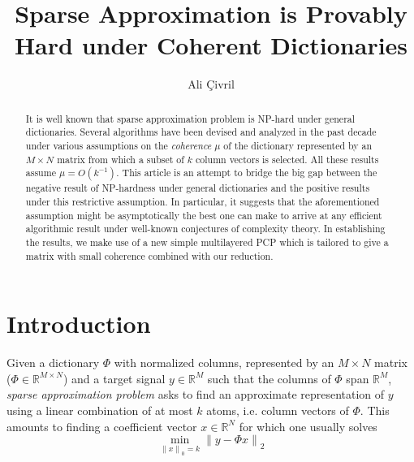 \documentclass[11pt]{article}
\title{Sparse Approximation is Provably Hard under Coherent Dictionaries}
\author{Ali {\c{C}}ivril}
\begin{document}
\maketitle

\begin{abstract}
It is well known that sparse approximation
problem is \textsf{NP}-hard under general dictionaries. Several algorithms
have been devised and analyzed in the past decade under various
assumptions on the \emph{coherence} $\mu$ of the dictionary
represented by an $M \times N$ matrix from which a subset of $k$
column vectors is selected. All these results assume $\mu=O(k^{-1})$.
This article is an attempt to bridge the big gap between the
negative result of \textsf{NP}-hardness under general dictionaries and the
positive results under this restrictive assumption. In particular,
it suggests that the aforementioned assumption might be asymptotically
the best one can make to arrive at any efficient algorithmic result
under well-known conjectures of complexity theory. In establishing the
results, we make use of a new simple multilayered PCP which is
tailored to give a matrix with small coherence combined with our
reduction.
\end{abstract}
%


\section{Introduction}
Given a dictionary $\Phi$ with normalized columns,
represented by an $M \times N$ matrix ($\Phi \in \mathbb{R}^{M
\times N}$) and a target signal $y \in \mathbb{R}^M$ such that the columns
of $\Phi$ span $\mathbb{R}^M$, \emph{sparse
approximation problem} asks to find an approximate representation
of $y$ using a linear combination of at most $k$ atoms, i.e.
column vectors of $\Phi$. This amounts to finding a coefficient
vector $x \in \mathbb{R}^N$ for which one usually solves
\begin{equation}
\label{sparse} \min_{{\|x\|}_0 = k}{\|y-\Phi x\|}_2
\end{equation}
\end{document}
